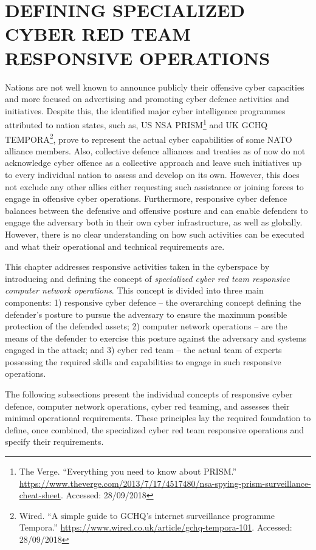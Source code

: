 \section{DEFINING SPECIALIZED CYBER RED TEAM RESPONSIVE OPERATIONS}
\label{sec:crtopreq}
\glsresetall
Nations are not well known to announce publicly their offensive cyber capacities and more focused on advertising and promoting cyber defence activities and initiatives. Despite this, the identified major cyber intelligence programmes attributed to nation states, such as, US NSA PRISM\footnote{The Verge. ``Everything you need to know about PRISM.'' \url{https://www.theverge.com/2013/7/17/4517480/nsa-spying-prism-surveillance-cheat-sheet}. Accessed: 28/09/2018} and UK GCHQ TEMPORA\footnote{Wired. ``A simple guide to GCHQ's internet surveillance programme Tempora.'' \url{https://www.wired.co.uk/article/gchq-tempora-101}. Accessed: 28/09/2018}, prove to represent the actual cyber capabilities of some NATO alliance members.
Also, collective defence alliances and treaties as of now do not acknowledge cyber offence as a collective approach and leave such initiatives up to every individual nation to assess and develop on its own. However, this does not exclude any other allies either requesting such assistance or joining forces to engage in offensive cyber operations.
Furthermore, responsive cyber defence balances between the defensive and offensive posture and can enable defenders to engage the adversary both in their own cyber infrastructure, as well as globally. However, there is no clear understanding on how such activities can be executed and what their operational and technical requirements are.

This chapter addresses responsive activities taken in the cyberspace by introducing and defining the concept of \textit{specialized cyber red team responsive computer network operations}. This concept is divided into three main components: 1) responsive cyber defence -- the overarching concept defining the defender's posture to pursue the adversary to ensure the maximum possible protection of the defended assets; 2) computer network operations -- are the means of the defender to exercise this posture against the adversary and systems engaged in the attack; and 3) cyber red team -- the actual team of experts possessing the required skills and capabilities to engage in such responsive operations.

The following subsections present the individual concepts of responsive cyber defence, computer network operations, cyber red teaming, and assesses their minimal operational requirements.
These principles lay the required foundation to define, once combined, the specialized cyber red team responsive operations and specify their requirements.

